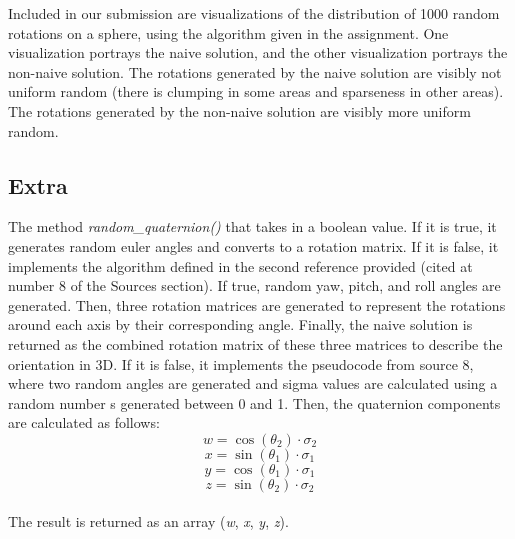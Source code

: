 \documentclass{article}
\begin{document}
\begin{enumerate}
Included in our submission are visualizations of the distribution of 1000 random rotations on a sphere, using the algorithm given in the assignment. One visualization portrays the naive solution, and the other visualization portrays the non-naive solution. The rotations generated by the naive solution are visibly not uniform random (there is clumping in some areas and sparseness in other areas). The rotations generated by the non-naive solution are visibly more uniform random.
\end{enumerate}

\subsection{Extra}
\hspace{\parindent}The method \textit{random\_quaternion()} that takes in a boolean value. If it is true, it generates random euler angles and converts to a rotation matrix. If it is false, it implements the algorithm defined in the second reference provided (cited at number 8 of the Sources section). If true, random yaw, pitch, and roll angles are generated. Then, three rotation matrices are generated to represent the rotations around each axis by their corresponding angle. Finally, the naive solution is returned as the combined rotation matrix of these three matrices to describe the orientation in 3D. If it is false, it implements the pseudocode from source 8, where two random angles are generated and sigma values are calculated using a random number s generated between 0 and 1. Then, the quaternion components are calculated as follows:
\[w = \cos(\theta_2) \cdot \sigma_2\]
\[x = \sin(\theta_1) \cdot \sigma_1\]
\[y = \cos(\theta_1) \cdot \sigma_1\]
\[z = \sin(\theta_2) \cdot \sigma_2\]\\
The result is returned as an array (\textit{w}, \textit{x}, \textit{y}, \textit{z}).\par
\end{document}
